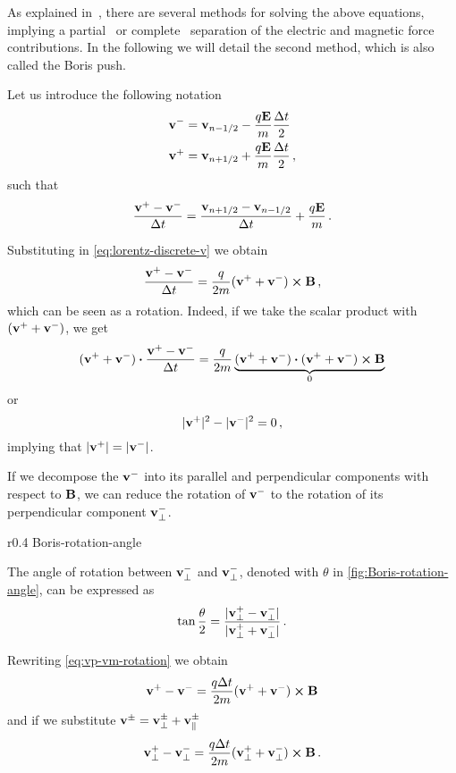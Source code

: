 \documentclass[12pt, class=report, crop=false]{standalone}
\begin{document}
As explained in~\textcite[Chapter 4--3]{birdsall_plasmaphysics_2005}, there are
several methods for solving the above equations, implying a
partial~\autocite{buneman_timereversibledifference_1967} or
complete~\autocite{boris_relativisticplasma_1970} separation of the electric
and magnetic force contributions. In the following we will detail the second
method, which is also called the Boris push.

Let us introduce the following notation
\begin{align*}
  \vb{v}^- &= \vb{v}_{n-1/2} - \frac{q \vb{E}}{m} \frac{\Delta t}{2} \\
  \vb{v}^+ &= \vb{v}_{n+1/2} + \frac{q \vb{E}}{m} \frac{\Delta t}{2}\,,
\end{align*}
such that
\[
\frac{\vb{v}^+ - \vb{v}^-}{\Delta t} = \frac{\vb{v}_{n+1/2} - \vb{v}_{n-1/2}}{\Delta t}
+ \frac{q \vb{E}}{m}\,.
\]

Substituting in \cref{eq:lorentz-discrete-v} we obtain
\begin{equation}
  \label{eq:vp-vm-rotation}
  \frac{\vb{v}^+ - \vb{v}^-}{\Delta t} = \frac{q}{2m} (\vb{v}^+ + \vb{v}^-) \cp \vb{B}\,,
\end{equation}
which can be seen as a rotation. Indeed, if we take the scalar product with
\((\vb{v}^+ + \vb{v}^-)\), we get
\[
(\vb{v}^+ + \vb{v}^-) \vdot \frac{\vb{v}^+ - \vb{v}^-}{\Delta t} =
\frac{q}{2m} \underbrace{(\vb{v}^+ + \vb{v}^-) \vdot (\vb{v}^+ + \vb{v}^-) \cp \vb{B}}_{0}
\]
or
\[
|\vb{v}^+|^2 - |\vb{v}^-|^2 = 0\,,
\]
implying that \(|\vb{v}^+| = |\vb{v}^-|\).

If we decompose the \(\vb{v}^-\) into its parallel and perpendicular components
with respect to \(\vb{B}\), we can reduce the rotation of \(\vb{v}^-\) to
the rotation of its perpendicular component \(\vb{v}^-_\perp\).

\begin{wrapfigure}[10]{r}{0.4\textwidth}
  \centering
  {Boris-rotation-angle}%
  \caption{Boris rotation angle}\label{fig:Boris-rotation-angle}%
\end{wrapfigure}

The angle of rotation between \(\vb{v}^-_\perp\) and \(\vb{v}^-_\perp\),
denoted with \(\theta\) in \cref{fig:Boris-rotation-angle},
can be expressed as
\[
\tan{\frac{\theta}{2}} = \frac{|\vb{v}^+_\perp - \vb{v}^-_\perp|}{|\vb{v}^+_\perp + \vb{v}^-_\perp|}\,.
\]

Rewriting \cref{eq:vp-vm-rotation} we obtain
\[
\vb{v}^+ - \vb{v}^- = \frac{q \Delta t}{2m} (\vb{v}^+ + \vb{v}^-) \cp \vb{B}
\]
and if we substitute \(\vb{v}^\pm = \vb{v}^\pm_\perp + \vb{v}^\pm_\parallel\)
\[
\vb{v}^+_\perp - \vb{v}^-_\perp = \frac{q \Delta t}{2m} (\vb{v}^+_\perp + \vb{v}^-_\perp) \cp \vb{B}\,.
\]
\end{document}
